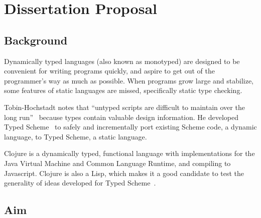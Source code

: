 
\chapter{Dissertation Proposal}

\section*{Background} 


Dynamically typed languages (also known as monotyped) are designed to be convenient for
writing programs quickly, and aspire to get out of the programmer's
way as much as possible. When programs grow large and stabilize,
some features of static languages are missed, specifically static
type checking. 

Tobin-Hochstadt notes that ``untyped scripts are difficult to 
maintain over the long run''~\cite{Tob10} because types
contain valuable design information.
He developed Typed Scheme~\cite{Tob10} 
to safely and incrementally port existing Scheme code, a dynamic language, to
Typed Scheme, a static language.

Clojure is a dynamically typed, functional language with implementations for the Java Virtual
Machine and Common Language Runtime, and compiling to Javascript. Clojure
is also a Lisp, which makes it a good candidate to test the generality of
ideas developed for Typed Scheme~\cite{Tob10}.

\section*{Aim} 


